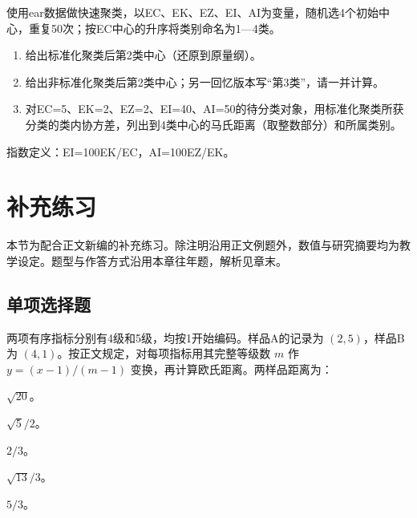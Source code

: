 \par\addvspace{6pt}\noindent\begin{minipage}{\linewidth}


使用ear数据做快速聚类，以EC、EK、EZ、EI、AI为变量，随机选4个初始中心，重复50次；按EC中心的升序将类别命名为1---4类。

\begin{enumerate}
\def\labelenumi{\arabic{enumi}.}
\tightlist
\item
  给出标准化聚类后第2类中心（还原到原量纲）。
\item
  给出非标准化聚类后第2类中心；另一回忆版本写``第3类''，请一并计算。
\item
  对EC=5、EK=2、EZ=2、EI=40、AI=50的待分类对象，用标准化聚类所获分类的类内协方差，列出到4类中心的马氏距离（取整数部分）和所属类别。
\end{enumerate}

指数定义：EI=100EK/EC，AI=100EZ/EK。



\end{minipage}\par\vspace{4pt}

\clearpage\section{补充练习}

本节为配合正文新编的补充练习。除注明沿用正文例题外，数值与研究摘要均为教学设定。题型与作答方式沿用本章往年题，解析见章末。

\par\addvspace{6pt}\noindent\begin{minipage}{\linewidth}

\subsection{单项选择题}


两项有序指标分别有4级和5级，均按1开始编码。样品A的记录为 \((2,5)\)，样品B为 \((4,1)\)。按正文规定，对每项指标用其完整等级数 \(m\) 作 \(y=(x-1)/(m-1)\) 变换，再计算欧氏距离。两样品距离为：


\begin{choices}

\item \(\sqrt{20}\)。

\item \(\sqrt{5}/2\)。

\item \(2/3\)。

\item \(\sqrt{13}/3\)。

\item \(5/3\)。

\end{choices}

\end{minipage}\par\vspace{4pt}

